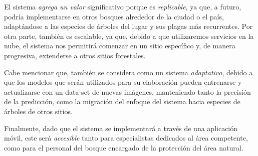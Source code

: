 El sistema \textit{agrega un valor} significativo porque es \textit{replicable}, ya que, a futuro, podría implementarse en otros bosques alrededor de la ciudad o el país, adaptándose a las especies de árboles del lugar y sus plagas más recurrentes. Por otra parte, también es escalable, ya que, debido a que utilizaremos servicios en la nube, el sistema nos permitirá comenzar en un sitio específico y, de manera progresiva, extenderse a otros sitios forestales.

Cabe mencionar que, también se considera como un sistema \textit{adaptativo}, debido a que los modelos que serán utilizados para su elaboración pueden entrenarse y actualizarse con un data-set de nuevas imágenes, manteniendo tanto la precisión de la predicción, como la migración del enfoque del sistema hacia especies de árboles de otros sitios.

Finalmente, dado que el sistema se implementará a través de una aplicación móvil, este será \textit{accesible} tanto para especialistas dedicados al área competente, como para el personal del bosque encargado de la protección del área natural.
